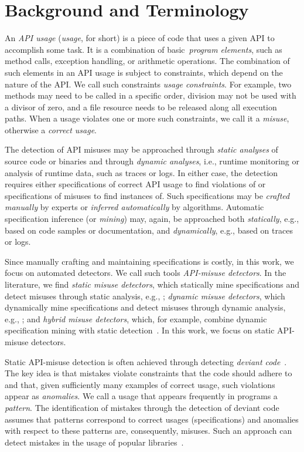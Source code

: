 
\section{Background and Terminology}
\label{sec:definitions}

An \emph{API usage} (\textit{usage}, for short) is a piece of code that uses a given API to accomplish some task.
It is a combination of basic~\textit{program elements}, such as method calls, exception handling, or arithmetic operations.
The combination of such elements in an API usage is subject to constraints, which depend on the nature of the API.
We call such constraints \emph{usage constraints}.
For example, two methods may need to be called in a specific order, division may not be used with a divisor of zero, and a file resource needs to be released along all execution paths.
When a usage violates one or more such constraints, we call it a \emph{misuse}, otherwise a \emph{correct usage}. 

The detection of API misuses may be approached through \emph{static analyses} of source code or binaries and through \emph{dynamic analyses}, i.e., runtime monitoring or analysis of runtime data, such as traces or logs.
In either case, the detection requires either specifications of correct API usage to find violations of or specifications of misuses to find instances of.
Such specifications may be \emph{crafted manually} by experts or \emph{inferred automatically} by algorithms.
Automatic specification inference (or \textit{mining}) may, again, be approached both \emph{statically}, e.g., based on code samples or documentation, and \emph{dynamically}, e.g., based on traces or logs.

Since manually crafting and maintaining specifications is costly, in this work, we focus on automated detectors.
We call such tools \emph{API-misuse detectors}.
In the literature, we find \emph{static misuse detectors}, which statically mine specifications and detect misuses through static analysis, e.g., \cite{WZL07,NNP+09,MM13};
\emph{dynamic misuse detectors}, which dynamically mine specifications and detect misuses through dynamic analysis, e.g., \cite{PG12,LZLJMSR14};
and \emph{hybrid misuse detectors}, which, for example, combine dynamic specification mining with static detection~\cite{PJAG12}.
In this work, we focus on static API-misuse detectors.
 
Static API-misuse detection is often achieved through detecting \emph{deviant code}~\cite{ECHC+01,LZ05,L07,WZL07,RGJ07,NNP+09,AX09,TX09,TX09b,WZ11,MM13,NPVN16}.
The key idea is that mistakes violate constraints that the code should adhere to and that, given sufficiently many examples of correct usage, such violations appear as \emph{anomalies}. 
We call a usage that appears frequently in programs a \emph{pattern}.
The identification of mistakes through the detection of deviant code assumes that patterns correspond to correct usages (specifications) and anomalies with respect to these patterns are, consequently, misuses.
Such an approach can detect mistakes in the usage of popular libraries~\cite{ECHC+01,LZ05,WZL07,NNP+09,WZ11,MM13}.

